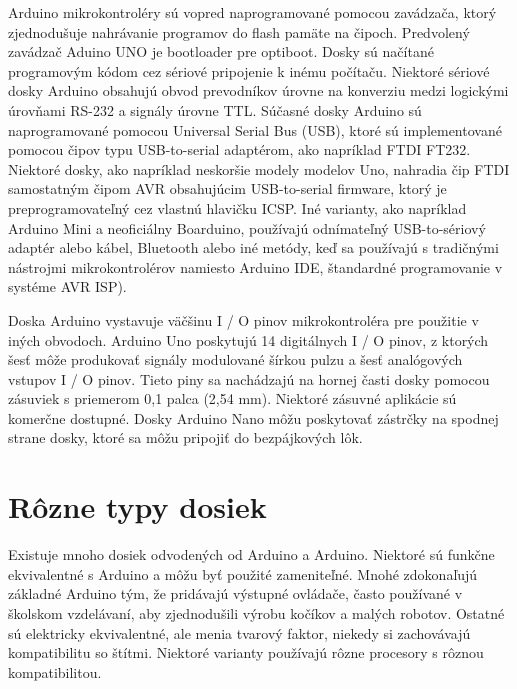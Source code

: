 Arduino mikrokontroléry sú vopred naprogramované pomocou zavádzača, ktorý zjednodušuje nahrávanie programov do flash pamäte na čipoch. Predvolený zavádzač Aduino UNO je bootloader pre optiboot. Dosky sú načítané programovým kódom cez sériové pripojenie k inému počítaču. Niektoré sériové dosky Arduino obsahujú obvod prevodníkov úrovne na konverziu medzi logickými úrovňami RS-232 a signály úrovne TTL. Súčasné dosky Arduino sú naprogramované pomocou Universal Serial Bus (USB), ktoré sú implementované pomocou čipov typu USB-to-serial adaptérom, ako napríklad FTDI FT232. Niektoré dosky, ako napríklad neskoršie modely modelov Uno, nahradia čip FTDI samostatným čipom AVR obsahujúcim USB-to-serial firmware, ktorý je preprogramovateľný cez vlastnú hlavičku ICSP. Iné varianty, ako napríklad Arduino Mini a neoficiálny Boarduino, používajú odnímateľný USB-to-sériový adaptér alebo kábel, Bluetooth alebo iné metódy, keď sa používajú s tradičnými nástrojmi mikrokontrolérov namiesto Arduino IDE, štandardné programovanie v systéme AVR ISP).

Doska Arduino vystavuje väčšinu I / O pinov mikrokontroléra pre použitie v iných obvodoch. Arduino Uno poskytujú 14 digitálnych I / O pinov, z ktorých šesť môže produkovať signály modulované šírkou pulzu a šesť analógových vstupov I / O pinov. Tieto piny sa nachádzajú na hornej časti dosky pomocou zásuviek s priemerom 0,1 palca (2,54 mm). Niektoré zásuvné aplikácie sú komerčne dostupné. Dosky Arduino Nano môžu poskytovať zástrčky na spodnej strane dosky, ktoré sa môžu pripojiť do bezpájkových lôk.

\section{Rôzne typy dosiek}

Existuje mnoho dosiek odvodených od Arduino a Arduino. Niektoré sú funkčne ekvivalentné s Arduino a môžu byť použité zameniteľné. Mnohé zdokonaľujú základné Arduino tým, že pridávajú výstupné ovládače, často používané v školskom vzdelávaní, aby zjednodušili výrobu kočíkov a malých robotov. Ostatné sú elektricky ekvivalentné, ale menia tvarový faktor, niekedy si zachovávajú kompatibilitu so štítmi. Niektoré varianty používajú rôzne procesory s rôznou kompatibilitou.

